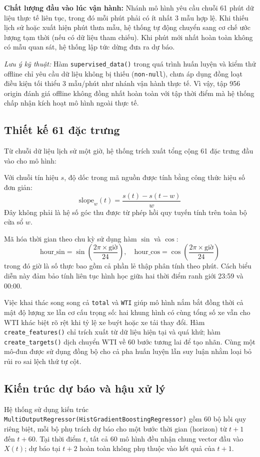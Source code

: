     \textbf{Chất lượng đầu vào lúc vận hành:} Nhánh mô hình yêu cầu chuỗi 61 phút dữ liệu thực tế liên tục, trong đó mỗi phút phải có ít nhất 3 mẫu hợp lệ. Khi thiếu lịch sử hoặc xuất hiện phút thưa mẫu, hệ thống tự động chuyển sang cơ chế ước lượng tạm thời (nếu có dữ liệu tham chiếu). Khi phút mới nhất hoàn toàn không có mẫu quan sát, hệ thống lập tức dừng đưa ra dự báo.

    \textit{Lưu ý kỹ thuật:} Hàm \texttt{supervised\_data()} trong quá trình huấn luyện và kiểm thử offline chỉ yêu cầu dữ liệu không bị thiếu (\texttt{non-null}), chưa áp dụng đồng loạt điều kiện tối thiểu 3 mẫu/phút như nhánh vận hành thực tế. Vì vậy, tập 956 origin đánh giá offline không đồng nhất hoàn toàn với tập thời điểm mà hệ thống chấp nhận kích hoạt mô hình ngoài thực tế.

    \subsection{Thiết kế 61 đặc trưng}
    Từ chuỗi dữ liệu lịch sử một giờ, hệ thống trích xuất tổng cộng 61 đặc trưng đầu vào cho mô hình:

    

    Với chuỗi tín hiệu $s$, độ dốc trong mã nguồn được tính bằng công thức hiệu số đơn giản:
    \[
    \text{slope}_w(t) = \frac{s(t) - s(t-w)}{w}
    \]
    Đây không phải là hệ số góc thu được từ phép hồi quy tuyến tính trên toàn bộ cửa sổ $w$. 

    Mã hóa thời gian theo chu kỳ sử dụng hàm $\sin$ và $\cos$:
    \[
    \text{hour\_sin} = \sin\left(\frac{2\pi \times \text{giờ}}{24}\right), \quad \text{hour\_cos} = \cos\left(\frac{2\pi \times \text{giờ}}{24}\right)
    \]
    trong đó giờ là số thực bao gồm cả phần lẻ thập phân tính theo phút. Cách biểu diễn này đảm bảo tính liên tục hình học giữa hai thời điểm ranh giới 23:59 và 00:00.

    Việc khai thác song song cả \texttt{total} và \texttt{WTI} giúp mô hình nắm bắt đồng thời cả mật độ lượng xe lẫn cơ cấu trọng số: hai khung hình có cùng tổng số xe vẫn cho WTI khác biệt rõ rệt khi tỷ lệ xe buýt hoặc xe tải thay đổi. Hàm \texttt{create\_features()} chỉ trích xuất từ dữ liệu hiện tại và quá khứ; hàm \texttt{create\_targets()} dịch chuyển WTI về 60 bước tương lai để tạo nhãn. Cùng một mô-đun được sử dụng đồng bộ cho cả pha huấn luyện lẫn suy luận nhằm loại bỏ rủi ro sai lệch thứ tự cột.

    \subsection{Kiến trúc dự báo và hậu xử lý}
    Hệ thống sử dụng kiến trúc \texttt{MultiOutputRegressor(HistGradientBoostingRegressor)} gồm 60 bộ hồi quy riêng biệt, mỗi bộ phụ trách dự báo cho một bước thời gian (horizon) từ $t+1$ đến $t+60$. Tại thời điểm $t$, tất cả 60 mô hình đều nhận chung vector đầu vào $X(t)$; dự báo tại $t+2$ hoàn toàn không phụ thuộc vào kết quả của $t+1$.

